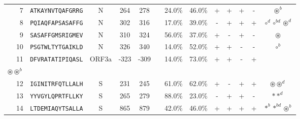 \begin{tabular}{rcccccccccccc}
7  &  \texttt{ATKAYNVTQAFGRRG} &       N &    264 &   278 &                &                          24.0\% &                           46.0\% &          + &           + &          + &           - &                                                                                                       $ \circledast^b $ \\
8  &  \texttt{PQIAQFAPSASAFFG} &       N &    302 &   316 &                &                          17.0\% &                           39.0\% &          - &           + &          + &           + &                                                                                    $ \circ^d \circ^{bd} \circledast^d $ \\
9  &  \texttt{SASAFFGMSRIGMEV} &       N &    310 &   324 &                &                          56.0\% &                           37.0\% &          + &           - &          + &           - &                                                                                                         $ \circledast $ \\
10 &  \texttt{PSGTWLTYTGAIKLD} &       N &    326 &   340 &                &                          14.0\% &                           52.0\% &          + &           + &          - &           - &                                                                                                             $ \circ^b $ \\
11 &  \texttt{DFVRATATIPIQASL} &   ORF3a &   -323 &  -309 &                &                          14.0\% &                           73.0\% &          + &           + &          - &           + &                                     \Centerstack{  $\circ \circ^b \circ^d \circ^{bd}$ \\  $\circledast \circledast^b$ } \\
12 &  \texttt{IGINITRFQTLLALH} &       S &    231 &   245 &                &                          61.0\% &                           62.0\% &          + &           - &          + &           + &                                                                                           $ \circledast \circledast^d $ \\
13 &  \texttt{YYVGYLQPRTFLLKY} &       S &    265 &   279 &                &                          88.0\% &                           23.0\% &          - &           + &          + &           - &                                                                                                         $ \ast \ast^d $ \\
14 &  \texttt{LTDEMIAQYTSALLA} &       S &    865 &   879 &                &                          42.0\% &                           46.0\% &          + &           + &          + &           + &                                                                                      $ \ast^b \ast^{bd} \circledast^b $ \\

\end{tabular}
